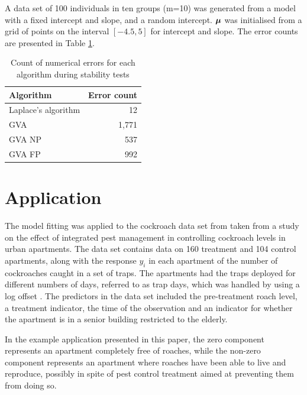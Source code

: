 \documentclass{article}[12pt]
\begin{document}
	A data set of 100 individuals in ten groups (m=10) was generated from a model with a fixed intercept
	and slope, and a random intercept. ${\boldsymbol \mu}$ was initialised from a grid of points on the interval
	$[-4.5, 5]$ for intercept and slope. The error counts are presented in Table
	\ref{tab:stability_results}.
	
	\begin{table}
		\caption{Count of numerical errors for each algorithm during stability tests}
		\label{tab:stability_results}
		\begin{tabular}{|l|r|}
			\hline
			Algorithm           & Error count \\
			\hline
			Laplace's algorithm & 12          \\
			GVA                 & 1,771       \\
			GVA NP              & 537         \\
			GVA FP              & 992         \\
			\hline
		\end{tabular}
	\end{table}
	
	\section{Application}
	\label{sec:application}
	
	
	The model fitting was applied to the cockroach data set from \cite{Gelman2007} taken from a study on the
	effect of integrated pest management in controlling cockroach levels in urban apartments. The data set
	contains data on 160 treatment and 104 control apartments, along with the response $y_i$ in each apartment of
	the number of cockroaches caught in a set of traps. The apartments had the traps deployed for different
	numbers of days, referred to as trap days, which was handled by using a log offset \cite{Agresti2002}. The
	predictors in the data set included the pre-treatment roach level, a treatment indicator, the time of the
	observation and an indicator for whether the apartment is in a senior building restricted to the elderly.
	
	In the example application presented in this paper, the zero component represents an apartment completely free
	of roaches, while the non-zero component represents an apartment where roaches have been able to live and
	reproduce, possibly in spite of pest control treatment aimed at preventing them from doing so.
	
\end{document}

